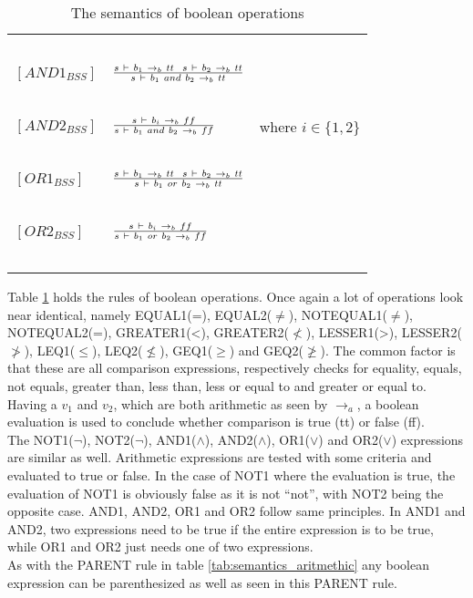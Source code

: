 \begin{table}[H]
\begin{tabular}{|l|l|l|}
			~			&															~																			& ~ \\
	$[AND1_{BSS}]$		& $s~\vdash~b_{1}~\rightarrow_{b}~tt~~s~\vdash~b_{2}~
	\rightarrow_{b}~tt \over s~\vdash~b_{1}~and~b_{2}~\rightarrow_{b}~tt$				& ~ \\
			~			&															~																			& ~ \\
	$[AND2_{BSS}]$		& $s~\vdash~b_{i}~\rightarrow_{b}~ff \over s~\vdash~b_{1}~and~b_{2}~\rightarrow_{b}~ff$													& where $i \in \{1,2\}$ \\
			~			&															~																			& ~ \\
	$[OR1_{BSS}]$		& $s~\vdash~b_{1}~\rightarrow_{b}~tt~~s~\vdash~b_{2}~
	\rightarrow_{b}~tt \over s~\vdash~b_{1}~or~b_{2}~\rightarrow_{b}~tt$				& ~ \\
			~			&															~																			& ~ \\
	$[OR2_{BSS}]$		& $s~\vdash~b_{i}~\rightarrow_{b}~ff \over s~\vdash~b_{1}~or~b_{2}~\rightarrow_{b}~ff$													& ~ \\
			~			&															~																			& ~ \\
	\hline
	\end{tabular}
	\label{tab:semantics_boolean}
	\caption{The semantics of boolean operations}
\end{table}

Table \ref{tab:semantics_boolean} holds the rules of boolean operations. Once again a lot of operations look near identical, namely EQUAL1(=), EQUAL2($\neq$), NOTEQUAL1($\neq$), NOTEQUAL2(=), GREATER1(<), GREATER2($\not<$), LESSER1(>), LESSER2($\not>$), LEQ1($\leq$), LEQ2($\not\leq$), GEQ1($\geq$) and GEQ2($\not\geq$). The common factor is that these are all comparison expressions, respectively checks for equality, equals, not equals, greater than, less than, less or equal to and greater or equal to. Having a $v_{1}$ and $v_{2}$, which are both arithmetic as seen by $\rightarrow_{a}$, a boolean evaluation is used to conclude whether comparison is true (tt) or false (ff). \\
The NOT1($\neg$), NOT2($\neg$), AND1($\wedge$), AND2($\wedge$), OR1($\vee$) and OR2($\vee$) expressions are similar as well. Arithmetic expressions are tested with some criteria and evaluated to true or false. In the case of NOT1 where the evaluation is true, the evaluation of NOT1 is obviously false as it is not ``not'', with NOT2 being the opposite case. AND1, AND2, OR1 and OR2 follow same principles. In AND1 and AND2, two expressions need to be true if the entire expression is to be true, while OR1 and OR2 just needs one of two expressions. \\
As with the PARENT rule in table \ref{tab:semantics_aritmethic} any boolean expression can be parenthesized as well as seen in this PARENT rule. \\ 

